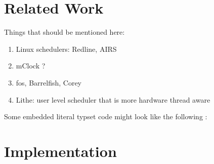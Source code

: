 \documentclass[letterpaper,twocolumn,11pt]{article}
\begin{document}
\section{Related Work}

Things that should be mentioned here:
\begin{enumerate}
\item Linux schedulers: Redline, AIRS
\item mClock ?
\item fos, Barrelfish, Corey
\item Lithe: user level scheduler that is more hardware thread aware
\end{enumerate}

Some embedded literal typset code might 
look like the following :

\section{Implementation}
\end{document}

